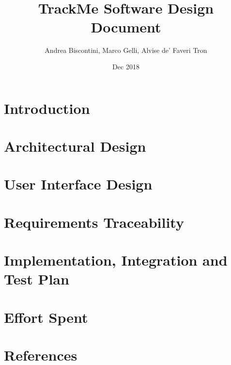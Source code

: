\documentclass[12pt]{article}
\title{TrackMe Software Design Document}								%
\author{Andrea Biscontini, Marco Gelli, Alvise de' Faveri Tron}								%
\date{Dec 2018}											%
\begin{document}


\newpage

\tableofcontents

\section{Introduction}


\newpage

\section{Architectural Design}


\newpage

\section{User Interface Design}


\newpage

\section{Requirements Traceability}


\newpage

\section{Implementation, Integration and Test Plan}


\newpage

\section{Effort Spent}


\newpage

\section{References}

\end{document}
